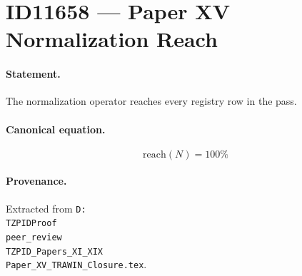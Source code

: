 \section*{ID11658 --- Paper XV Normalization Reach}

\paragraph{Statement.}
The normalization operator reaches every registry row in the pass.

\paragraph{Canonical equation.}
\[
\mathrm{reach}(N)=100\%
\]

\paragraph{Provenance.}
Extracted from \texttt{D:\\TZPIDProof\\peer\_review\\TZPID\_Papers\_XI\_XIX\\Paper\_XV\_TRAWIN\_Closure.tex}.
